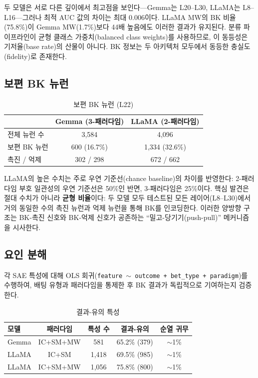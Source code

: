 \documentclass[11pt,a4paper]{article}
\begin{document}
두 모델은 서로 다른 깊이에서 최고점을 보인다---Gemma는 L20--L30, LLaMA는 L8--L16---그러나 최적 AUC 값의 차이는 최대 0.006이다. LLaMA MW의 BK 비율(75.8\%)이 Gemma MW(1.7\%)보다 44배 높음에도 이러한 결과가 유지된다. 분류 파이프라인이 균형 클래스 가중치(balanced class weights)를 사용하므로, 이 동등성은 기저율(base rate)의 산물이 아니다. BK 정보는 두 아키텍처 모두에서 동등한 충실도(fidelity)로 존재한다.

\subsection{보편 BK 뉴런}

\begin{table}[H]
\centering
\caption{보편 BK 뉴런 (L22)}
\begin{tabular}{lcc}
\toprule
 & \textbf{Gemma (3-패러다임)} & \textbf{LLaMA (2-패러다임)} \\
\midrule
전체 뉴런 수 & 3{,}584 & 4{,}096 \\
보편 BK 뉴런 & 600 (16.7\%) & 1{,}334 (32.6\%) \\
촉진 / 억제 & 302 / 298 & 672 / 662 \\
\bottomrule
\end{tabular}
\end{table}

LLaMA의 높은 수치는 주로 우연 기준선(chance baseline)의 차이를 반영한다: 2-패러다임 부호 일관성의 우연 기준선은 50\%인 반면, 3-패러다임은 25\%이다. 핵심 발견은 절대 수치가 아니라 \textbf{균형 비율}이다: 두 모델 모두 테스트된 모든 레이어(L8--L30)에서 거의 동일한 수의 촉진 뉴런과 억제 뉴런을 통해 BK를 인코딩한다. 이러한 양방향 구조는 BK-촉진 신호와 BK-억제 신호가 공존하는 ``밀고-당기기(push-pull)'' 메커니즘을 시사한다.

\subsection{요인 분해}

각 SAE 특성에 대해 OLS 회귀(\texttt{feature $\sim$ outcome + bet\_type + paradigm})를 수행하여, 배팅 유형과 패러다임을 통제한 후 BK 결과가 독립적으로 기여하는지 검증한다.

\begin{table}[H]
\centering
\caption{결과-유의 특성}
\begin{tabular}{lcccc}
\toprule
\textbf{모델} & \textbf{패러다임} & \textbf{특성 수} & \textbf{결과-유의} & \textbf{순열 귀무} \\
\midrule
Gemma & IC+SM+MW & 581 & 65.2\% (379) & ${\sim}$1\% \\
LLaMA & IC+SM & 1{,}418 & 69.5\% (985) & ${\sim}$1\% \\
LLaMA & IC+SM+MW & 1{,}056 & 75.8\% (800) & ${\sim}$1\% \\
\bottomrule
\end{tabular}
\end{table}
\end{document}
